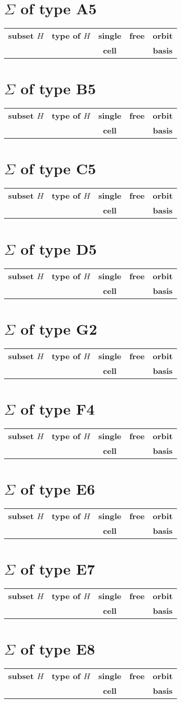 \documentclass{article}
\newcommand{\resulttable}[1]{
  \section*{\(\Sigma\) of type #1}
\begin{longtable}{llccc}
  \toprule
    \textbf{subset \(H\)} & \textbf{type of \(H\)} & \textbf{single} & \textbf{free} & \textbf{orbit} \\
                  &               &   \textbf{cell}   &                & \textbf{basis} \\
  \midrule
  
  \bottomrule
\end{longtable}
}
\begin{document}
\resulttable{A5}\newpage
\resulttable{B5}\newpage
\resulttable{C5}\newpage
\resulttable{D5}\newpage
\resulttable{G2}
\resulttable{F4}\newpage
\resulttable{E6}\newpage
\resulttable{E7}\newpage
\resulttable{E8}
\end{document}
